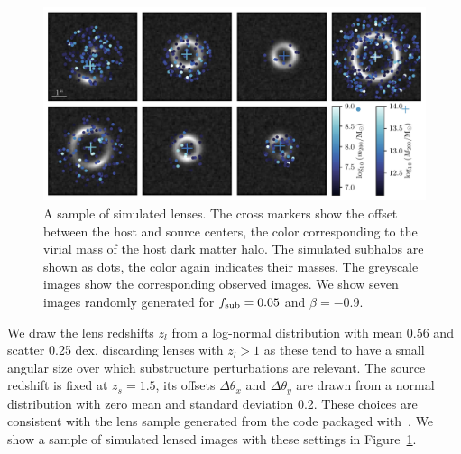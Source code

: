 \documentclass[twocolumn]{aastex63}
\begin{document}
\begin{figure}
\centering
\includegraphics[width=1.\textwidth]{figures/simulations}
\caption{A sample of simulated lenses. The cross markers show the offset between the host and source centers, the color corresponding to the virial mass of the host dark matter halo. The simulated subhalos are shown as dots, the color again indicates their masses. The greyscale images show the corresponding observed images. We show seven images randomly generated for $f_{\mathrm{sub}} = 0.05$ and $\beta = -0.9$. }
\label{fig:simulations}
\end{figure}

We draw the lens redshifts $z_l$ from a log-normal distribution with mean 0.56 and scatter 0.25 dex, discarding lenses with $z_l > 1$ as these tend to have a small angular size over which substructure perturbations are relevant. The source redshift is fixed at $z_s = 1.5$, its offsets $\Delta\theta_x$ and $\Delta\theta_y$ are drawn from a normal distribution with zero mean and standard deviation 0.2. These choices are consistent with the lens sample generated from the  code packaged with~\citet{2015ApJ...811...20C}. We show a sample of simulated lensed images with these settings in Figure~\ref{fig:simulations}.
\end{document}
